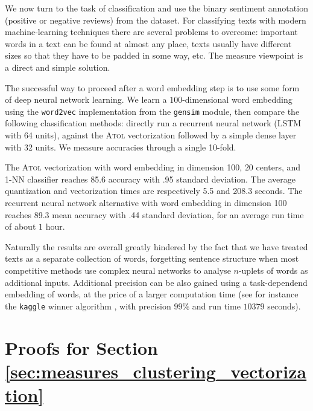 \documentclass[noinfoline,preprint]{article}
\renewcommand{\1}{\mathds 1}
\begin{document}
We now turn to the task of classification and use the binary sentiment annotation (positive or negative reviews) from the dataset. For classifying texts with modern machine-learning techniques there are several problems to overcome: important words in a text can be found at almost any place, texts usually have different sizes so that they have to be padded in some way, etc. The measure viewpoint is a direct and simple solution.

The successful way to proceed after a word embedding step is to use some form of deep neural network learning. We learn a $100$-dimensional word embedding using the \texttt{word2vec} implementation from the \texttt{gensim} module, then compare the following classification methods: directly run a recurrent neural network (LSTM with 64 units), against the \textsc{Atol} vectorization followed by a simple dense layer with 32 units. We measure accuracies through a single 10-fold.

The \textsc{Atol} vectorization with word embedding in dimension 100, $20$ centers, and 1-NN classifier reaches 85.6 accuracy with .95 standard deviation. The average quantization and vectorization times are respectively 5.5 and 208.3 seconds. The recurrent neural network alternative with word embedding in dimension 100 reaches 89.3 mean accuracy with .44 standard deviation, for an average run time of about $1$ hour. 

Naturally the results are overall greatly hindered by the fact that we have treated texts as a separate collection of words, forgetting sentence structure when most competitive methods use complex neural networks to analyse $n$-uplets of words as additional inputs. Additional precision can be also gained using a task-dependend embedding of words, at the price of a larger computation time (see for instance the \texttt{kaggle} winner algorithm \cite{Cherniuk19}, with precision $99\%$ and run time $10379$ seconds).

\section{Proofs for Section \ref{sec:measures_clustering_vectorization}}
\label{sec:proof_sec_clustering_based_on_vectorization}
\end{document}
